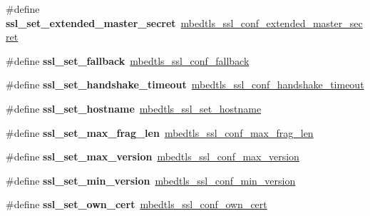 \begin{DoxyCompactItemize}
\#define {\bfseries ssl\+\_\+set\+\_\+extended\+\_\+master\+\_\+secret}~\mbox{\hyperlink{ssl_8h_a133db91d4a1dd44d212ac57e386c23b3}{mbedtls\+\_\+ssl\+\_\+conf\+\_\+extended\+\_\+master\+\_\+secret}}
\item 
\mbox{\label{compat-1_83_8h_a506b1d0d0a9f3036e3d23d138fe56ef9}} 
\#define {\bfseries ssl\+\_\+set\+\_\+fallback}~\mbox{\hyperlink{ssl_8h_abb5a878b9aabe137572a8c73a840c480}{mbedtls\+\_\+ssl\+\_\+conf\+\_\+fallback}}
\item 
\mbox{\label{compat-1_83_8h_a1aaee2b36f80c22844cad91fc5d5f088}} 
\#define {\bfseries ssl\+\_\+set\+\_\+handshake\+\_\+timeout}~\mbox{\hyperlink{ssl_8h_a6625bc4e7ffd535900ef53259cc21651}{mbedtls\+\_\+ssl\+\_\+conf\+\_\+handshake\+\_\+timeout}}
\item 
\mbox{\label{compat-1_83_8h_a19fc3e22f7764f8522dbff6a371b8ff8}} 
\#define {\bfseries ssl\+\_\+set\+\_\+hostname}~\mbox{\hyperlink{ssl_8h_aa659024cf89e20d6d2248c0626db7ef2}{mbedtls\+\_\+ssl\+\_\+set\+\_\+hostname}}
\item 
\mbox{\label{compat-1_83_8h_a89f74960d63a17aeed3ae9c6e29771d9}} 
\#define {\bfseries ssl\+\_\+set\+\_\+max\+\_\+frag\+\_\+len}~\mbox{\hyperlink{ssl_8h_ac68fda83c26b3078e80f4dfc3b09bb94}{mbedtls\+\_\+ssl\+\_\+conf\+\_\+max\+\_\+frag\+\_\+len}}
\item 
\mbox{\label{compat-1_83_8h_aa409773310e237ba18a27c98a856996b}} 
\#define {\bfseries ssl\+\_\+set\+\_\+max\+\_\+version}~\mbox{\hyperlink{ssl_8h_afc1a81e3fcbea3045b41ce739a47f54e}{mbedtls\+\_\+ssl\+\_\+conf\+\_\+max\+\_\+version}}
\item 
\mbox{\label{compat-1_83_8h_a06d39c56d5722ad2d7b98a68d0606d7a}} 
\#define {\bfseries ssl\+\_\+set\+\_\+min\+\_\+version}~\mbox{\hyperlink{ssl_8h_a0eade5c83cc08001672061c5925caaaa}{mbedtls\+\_\+ssl\+\_\+conf\+\_\+min\+\_\+version}}
\item 
\mbox{\label{compat-1_83_8h_af98b99cb2c947f22bbbf3ea835d0dee2}} 
\#define {\bfseries ssl\+\_\+set\+\_\+own\+\_\+cert}~\mbox{\hyperlink{ssl_8h_a4e54e9ace21beb608bae36ddb81a4fb0}{mbedtls\+\_\+ssl\+\_\+conf\+\_\+own\+\_\+cert}}
\item 

\end{DoxyCompactItemize}
